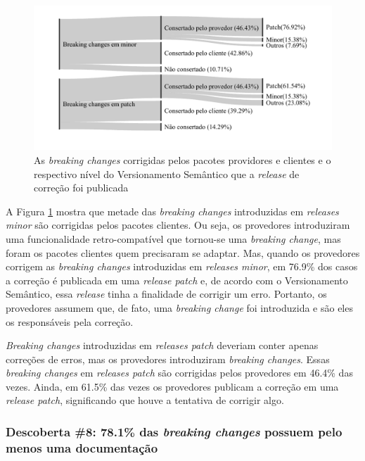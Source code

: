 \begin{figure}
	\centering
	\includegraphics[scale=0.8]{figuras/semver_fixed_prov.pdf}
	\caption{As \textit{breaking changes} corrigidas pelos pacotes providores e clientes e o respectivo nível do Versionamento Semântico que a \textit{release} de correção foi publicada}
	\label{fig:semver_fixed}
\end{figure}{}

A Figura \ref{fig:semver_fixed} mostra que metade das \textit{breaking changes} introduzidas em \textit{releases minor} são corrigidas pelos pacotes clientes. Ou seja, os provedores introduziram uma funcionalidade retro-compatível que tornou-se uma \textit{breaking change}, mas foram os pacotes clientes quem precisaram se adaptar. Mas, quando os provedores corrigem as \textit{breaking changes} introduzidas em \textit{releases minor}, em 76.9\% dos casos a correção é publicada em uma \textit{release patch} e, de acordo com o Versionamento Semântico, essa \textit{release} tinha a finalidade de corrigir um erro. Portanto, os provedores assumem que, de fato, uma \textit{breaking change} foi introduzida e são eles os responsáveis pela correção.

\textit{Breaking changes} introduzidas em \textit{releases patch} deveriam conter apenas correções de erros, mas os provedores introduziram \textit{breaking changes}. Essas \textit{breaking changes} em \textit{releases patch} são corrigidas pelos provedores em 46.4\% das vezes. Ainda, em 61.5\% das vezes os provedores publicam a correção em uma \textit{release patch}, significando que houve a tentativa de corrigir algo.

\subsubsection{Descoberta \#8: 78.1\% das \textit{breaking changes} possuem pelo menos uma documentação}

